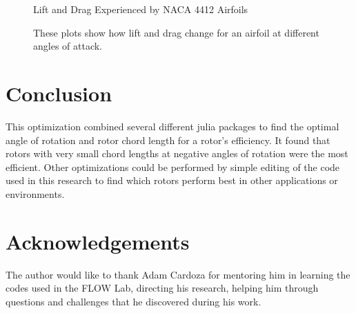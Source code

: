 \documentclass[journal ]{new-aiaa}
\begin{document}
\begin{figure}[H]
\centering
	\caption{Lift and Drag Experienced by NACA 4412 Airfoils}
	\captionsetup{aboveskip=0pt,font=it}
	\caption*{These plots show how lift and drag change for an airfoil at different angles of attack.}
	\label{fig:8}
\end{figure}


\section{Conclusion}

This optimization combined several different julia packages to find the optimal angle of rotation and rotor chord length for a rotor's efficiency. It found that rotors with very small chord lengths at negative angles of rotation were the most efficient. Other optimizations could be performed by simple editing of the code used in this research to find which rotors perform best in other applications or environments. 


\section{Acknowledgements}

The author would like to thank Adam Cardoza for mentoring him in learning the codes used in the FLOW Lab, directing his research, helping him through questions and challenges that he discovered during his work.




\end{document}
